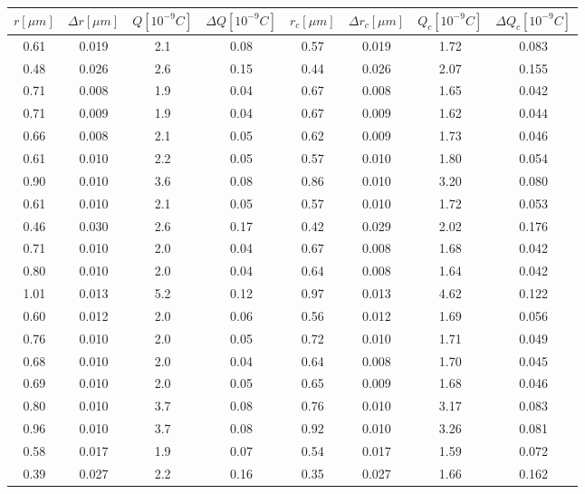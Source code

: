 \documentclass{scrartcl}
\begin{document}
	\begin{figure}[H]
		\begin{tabular}{c| c| c| c| c| c| c| c}
			\hline
			$r [\mu m]$ & $\Delta r [\mu m] $& $Q [10^{-9} C]$ & $\Delta Q [10^{-9} C]$ & $r_c [\mu m]$ & $\Delta r_c [\mu m]$ & $Q_c [10^{-9} C]$& $\Delta Q_c [10^{-9} C]$\\
			\hline
			0.61 & 0.019 & 2.1 & 0.08 & 0.57 & 0.019 & 1.72 & 0.083\\
			0.48 & 0.026 & 2.6 & 0.15 & 0.44 & 0.026 & 2.07 & 0.155\\
			0.71 & 0.008 & 1.9 & 0.04 & 0.67 & 0.008 & 1.65 & 0.042\\
			0.71 & 0.009 & 1.9 & 0.04 & 0.67 & 0.009 & 1.62 & 0.044\\
			0.66 & 0.008 & 2.1 & 0.05 & 0.62 & 0.009 & 1.73 & 0.046\\
			0.61 & 0.010 & 2.2 & 0.05 & 0.57 & 0.010 & 1.80 & 0.054\\
			0.90 & 0.010 & 3.6 & 0.08 & 0.86 & 0.010 & 3.20 & 0.080\\
			0.61 & 0.010 & 2.1 & 0.05 & 0.57 & 0.010 & 1.72 & 0.053\\
			0.46 & 0.030 & 2.6 & 0.17 & 0.42 & 0.029 & 2.02 & 0.176\\
			0.71 & 0.010 & 2.0 & 0.04 & 0.67 & 0.008 & 1.68 & 0.042\\
			0.80 & 0.010 & 2.0 & 0.04 & 0.64 & 0.008 & 1.64 & 0.042\\
			1.01 & 0.013 & 5.2 & 0.12 & 0.97 & 0.013 & 4.62 & 0.122\\
			0.60 & 0.012 & 2.0 & 0.06 & 0.56 & 0.012 & 1.69 & 0.056\\
			0.76 & 0.010 & 2.0 & 0.05 & 0.72 & 0.010 & 1.71 & 0.049\\
			0.68 & 0.010 & 2.0 & 0.04 & 0.64 & 0.008 & 1.70 & 0.045\\
			0.69 & 0.010 & 2.0 & 0.05 & 0.65 & 0.009 & 1.68 & 0.046\\
			0.80 & 0.010 & 3.7 & 0.08 & 0.76 & 0.010 & 3.17 & 0.083\\
			0.96 & 0.010 & 3.7 & 0.08 & 0.92 & 0.010 & 3.26 & 0.081\\
			0.58 & 0.017 & 1.9 & 0.07 & 0.54 & 0.017 & 1.59 & 0.072\\
			0.39 & 0.027 & 2.2 & 0.16 & 0.35 & 0.027 & 1.66 & 0.162\\
	   \end{tabular}
	\end{figure}		
\end{document}
